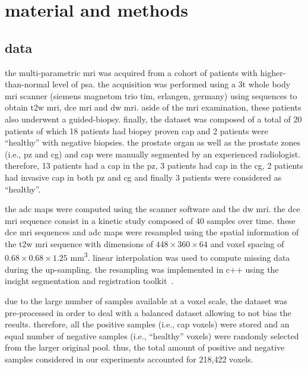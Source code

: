 \section{material and methods}\label{sec:methodology}

\subsection{data}\label{subsec:data}

the multi-parametric \ac{mri} was acquired from a cohort of patients with higher-than-normal level of \ac{psa}. the acquisition was performed using a 3t whole body \ac{mri} scanner (siemens magnetom trio tim, erlangen, germany) using sequences to obtain \ac{t2w} \ac{mri}, \ac{dce} \ac{mri} and \ac{dw} \ac{mri}. aside of the \ac{mri} examination, these patients also underwent a guided-biopsy. finally, the dataset was composed of a total of 20 patients of which 18 patients had biopsy proven \ac{cap} and 2 patients were ``healthy'' with negative biopsies. the prostate organ as well as the prostate zones (i.e., \ac{pz} and \ac{cg}) and \ac{cap} were manually segmented by an experienced radiologist. therefore, 13 patients had a \ac{cap} in the \ac{pz}, 3 patients had \ac{cap} in the \ac{cg}, 2 patients had invasive \ac{cap} in both \ac{pz} and \ac{cg} and finally 3 patients were considered as ``healthy''. 

the \ac{adc} maps were computed using the scanner software and the \ac{dw} \ac{mri}. the \ac{dce} \ac{mri} sequence consist in a kinetic study composed of 40 samples over time. these \ac{dce} \ac{mri} sequences and \ac{adc} maps were resampled using the spatial information of the \ac{t2w} \ac{mri} sequence with dimensions of $448 \times 360 \times 64$ and voxel spacing of $0.68 \times 0.68 \times 1.25 $ mm\textsuperscript{3}. linear interpolation was used to compute missing data during the up-sampling. the resampling was implemented in c++ using the insight segmentation and registration toolkit~\cite{johnson2013}.

due to the large number of samples available at a voxel scale, the dataset was pre-processed in order to deal with a balanced dataset allowing to not bias the results. therefore, all the positive samples (i.e., \ac{cap} voxels) were stored and an equal number of negative samples (i.e., ``healthy'' voxels) were randomly selected from the larger original pool. thus, the total amount of positive and negative samples considered in our experiments accounted for 218,422 voxels.

